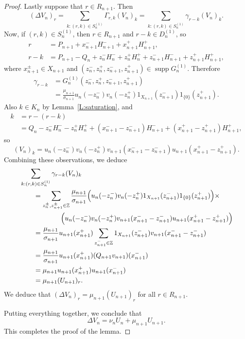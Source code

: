 \documentclass[11pt,reqno]{amsart}
\theoremstyle{plain}
\theoremstyle{definition}
\theoremstyle{remark}
\newcommand{\ZZ}{\mathbb{Z}}
\DeclareMathOperator{\supp}{supp}
\begin{document}
\begin{proof}
Lastly suppose that $r\in R_{n+1}$. Then
\[
(\Delta V_n)_r
=\sum_{k:(r,k)\in S_n^{(1)}}\Gamma_{r,k}(V_n)_k
=\sum_{k:(r,k)\in S_n^{(1)}}\gamma_{r-k}(V_n)_k.
\]
Now, if $(r,k)\in S_n^{(1)}$, then $r\in R_{n+1}$ and $r-k\in D_n^{(1)}$, so
\begin{align*}
r&=P_{n+1}+x_{n+1}^{-}H_{n+1}^-+x_{n+1}^+H_{n+1}^+,\\
r-k&=P_{n+1}-Q_n+z_n^-H_n^-+z_n^+H_n^++z_{n+1}^-H_{n+1}^-+z_{n+1}^+H_{n+1}^+,
\end{align*}
where $x_{n+1}^\pm\in X_{n+1}$ and $(z_n^-,z_n^+,z_{n+1}^-,z_{n+1}^+)\in\supp G_n^{(1)}$.
Therefore
\begin{align*}
\gamma_{r-k}
&=G_n^{(1)}(z_n^-,z_n^+,z_{n+1}^-,z_{n+1}^+)\\
&=\frac{\mu_{n+1}}{\sigma_{n+1}}u_n(-z_n^-)v_n(-z_n^+)1_{X_{n+1}}(z_{n+1}^-)1_{\{0\}}(z_{n+1}^+).
\end{align*}
Also $k\in K_n$ by Lemma~\ref{L:saturation}, and 
\begin{align*}
k&=r-(r-k)\\
&=Q_n-z_n^-H_n^--z_n^+H_n^++(x_{n+1}^--z_{n+1}^-)H_{n+1}^-+(x_{n+1}^+-z_{n+1}^+)H_{n+1}^+,
\end{align*}
so
\[ 
(V_n)_{k}=u_n(-z_n^-)v_n(-z_n^+)v_{n+1}(x_{n+1}^--z_{n+1}^-)u_{n+1}(x_{n+1}^+-z_{n+1}^+).
\]
Combining these observations, we deduce
\begin{align*}
&\sum_{k:(r,k)\in S_n^{(1)}}\gamma_{r-k}(V_n)_k\\
&\qquad=\sum_{z_n^\pm,z_{n+1}^\pm\in\ZZ}\frac{\mu_{n+1}}{\sigma_{n+1}}\Bigl(u_n(-z_n^-)v_n(-z_n^+)1_{X_{n+1}}(z_{n+1}^-)1_{\{0\}}(z_{n+1}^+)\Bigr)\times\\
&\qquad\qquad\qquad\Bigl(u_n(-z_n^-)v_n(-z_n^+)v_{n+1}(x_{n+1}^--z_{n+1}^-)u_{n+1}(x_{n+1}^+-z_{n+1}^+)\Bigr)\\
&\qquad=\frac{\mu_{n+1}}{\sigma_{n+1}}u_{n+1}(x_{n+1}^+)\sum_{z_{n+1}^-\in\ZZ}1_{X_{n+1}}(z_{n+1}^-)v_{n+1}(x_{n+1}^--z_{n+1}^-)\\
&\qquad=\frac{\mu_{n+1}}{\sigma_{n+1}}u_{n+1}(x_{n+1}^+)(Q_{n+1}v_{n+1})(x_{n+1}^-)\\
&\qquad=\mu_{n+1}u_{n+1}(x_{n+1}^+)u_{n+1}(x_{n+1}^-)\\
&\qquad=\mu_{n+1}(U_{n+1})_r.
\end{align*}
We deduce that $(\Delta V_n)_r=\mu_{n+1}(U_{n+1})_r$ for all 
$r\in R_{n+1}$.


Putting everything together, we conclude that
\[
\Delta V_n=\nu_n U_n+\mu_{n+1}U_{n+1}.
\]
This completes the proof of the lemma.
\end{proof}
\end{document}
